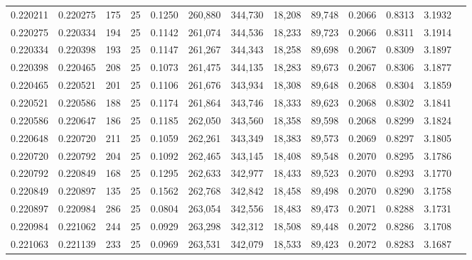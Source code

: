 \begin{tabular}{rrrrrrrrrrrrr}
0.220211 & 0.220275 &   175 &  25 &                                     0.1250 & 260,880 & 344,730 &  18,208 &  89,748 & 0.2066 & 0.8313 & 3.1932 \\
0.220275 & 0.220334 &   194 &  25 &                                     0.1142 & 261,074 & 344,536 &  18,233 &  89,723 & 0.2066 & 0.8311 & 3.1914 \\
0.220334 & 0.220398 &   193 &  25 &                                     0.1147 & 261,267 & 344,343 &  18,258 &  89,698 & 0.2067 & 0.8309 & 3.1897 \\
0.220398 & 0.220465 &   208 &  25 &                                     0.1073 & 261,475 & 344,135 &  18,283 &  89,673 & 0.2067 & 0.8306 & 3.1877 \\
0.220465 & 0.220521 &   201 &  25 &                                     0.1106 & 261,676 & 343,934 &  18,308 &  89,648 & 0.2068 & 0.8304 & 3.1859 \\
0.220521 & 0.220586 &   188 &  25 &                                     0.1174 & 261,864 & 343,746 &  18,333 &  89,623 & 0.2068 & 0.8302 & 3.1841 \\
0.220586 & 0.220647 &   186 &  25 &                                     0.1185 & 262,050 & 343,560 &  18,358 &  89,598 & 0.2068 & 0.8299 & 3.1824 \\
0.220648 & 0.220720 &   211 &  25 &                                     0.1059 & 262,261 & 343,349 &  18,383 &  89,573 & 0.2069 & 0.8297 & 3.1805 \\
0.220720 & 0.220792 &   204 &  25 &                                     0.1092 & 262,465 & 343,145 &  18,408 &  89,548 & 0.2070 & 0.8295 & 3.1786 \\
0.220792 & 0.220849 &   168 &  25 &                                     0.1295 & 262,633 & 342,977 &  18,433 &  89,523 & 0.2070 & 0.8293 & 3.1770 \\
0.220849 & 0.220897 &   135 &  25 &                                     0.1562 & 262,768 & 342,842 &  18,458 &  89,498 & 0.2070 & 0.8290 & 3.1758 \\
0.220897 & 0.220984 &   286 &  25 &                                     0.0804 & 263,054 & 342,556 &  18,483 &  89,473 & 0.2071 & 0.8288 & 3.1731 \\
0.220984 & 0.221062 &   244 &  25 &                                     0.0929 & 263,298 & 342,312 &  18,508 &  89,448 & 0.2072 & 0.8286 & 3.1708 \\
0.221063 & 0.221139 &   233 &  25 &                                     0.0969 & 263,531 & 342,079 &  18,533 &  89,423 & 0.2072 & 0.8283 & 3.1687 \\

\end{tabular}
